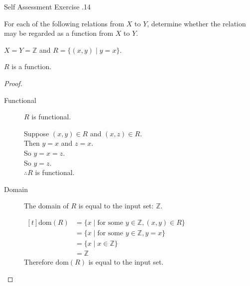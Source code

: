 \documentclass[\main/notes.tex]{subfiles}
\begin{document}
\begin{exercise}{Self Assessment Exercise \thechapter.14}
\begin{questions}
\begin{questions}
\begin{answer}
									\end{answer}
							\end{questions}
						\item For each of the following relations from $X$ to $Y$, determine whether the relation may be regarded as a function from $X$ to $Y$.
							\begin{questions}
								\item $X = Y = $ and $R = \bigl\{(x, y) \mid y = x\bigr\}$.\\
									\begin{answer}
										$R$ is a function.
										\begin{proof}
											$ $
											\begin{description}
												\item[Functional] $R$ is functional.
													\begin{subproof}[Subproof]
														Suppose $(x, y) \in R$ and $(x, z) \in R$.\\
														Then $y = x$ and $z = x$.\\
														So $y = x = z$.\\
														So $y = z$.\\
														$\therefore R$ is functional.
													\end{subproof}
												\item[Domain] The domain of $R$ is equal to the input set: $$.
													\begin{subproof}[Subproof] $
														\begin{aligned}[t]
															(R) &= \bigl\{x \mid \text{for some } y \in \mathbb{Z}, (x, y) \in R\bigr\}\\
															&= \{x \mid {} y \in {}, y = x\}\\
															&= \{x \mid x \in {}\}\\
															&= 
														\end{aligned}$\\
														Therefore $(R)$ is equal to the input set.
													\end{subproof}
											\end{description}

\end{proof}
\end{answer}
\end{questions}
\end{questions}
\end{exercise}
\end{document}

